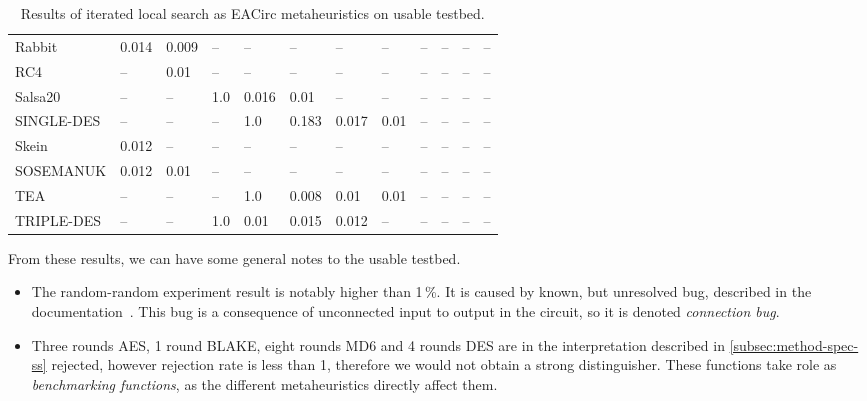 \documentclass[
  print, %
  Table,   %
  nolof,     %
  nolot,     %
  11pt, %
  oneside  %
]{fithesis3}
\newcommand{\fd}{\cellcolor{red!13}}
\newcommand{\fn}{\cellcolor{green!13}}
\begin{document}
\begin{table}[H]
\begin{tabular}{l|l l l l l l l l l l l}
Rabbit       & \fn{}0.014 & \fn{}0.009 & \fn{}--    & \fn{}--    & \fn{}--    & \fn{}--    & \fn{}--    & \fn{}--    & \fn{}--    & \fn{}--    & \fn{}--   \\
RC4          & \fd{}--    & \fn{}0.01  & \fn{}--    & \fn{}--    & \fn{}--    & \fn{}--    & \fn{}--    & \fn{}--    & \fn{}--    & \fn{}--    & \fn{}--   \\
Salsa20      & \fd{}--    & \fd{}--    & \fd{}1.0   & \fn{}0.016 & \fn{}0.01  & \fn{}--    & \fn{}--    & \fn{}--    & \fn{}--    & \fn{}--    & \fn{}--   \\
SINGLE-DES   & \fd{}--    & \fd{}--    & \fd{}--    & \fd{}1.0   & \fd{}0.183 & \fn{}0.017 & \fn{}0.01  & \fn{}--    & \fn{}--    & \fn{}--    & \fn{}--   \\
Skein        & \fn{}0.012 & \fn{}--    & \fn{}--    & \fn{}--    & \fn{}--    & \fn{}--    & \fn{}--    & \fn{}--    & \fn{}--    & \fn{}--    & \fn{}--   \\
SOSEMANUK    & \fn{}0.012 & \fn{}0.01  & \fn{}--    & \fn{}--    & \fn{}--    & \fn{}--    & \fn{}--    & \fn{}--    & \fn{}--    & \fn{}--    & \fn{}--   \\
TEA          & \fd{}--    & \fd{}--    & \fd{}--    & \fd{}1.0   & \fn{}0.008 & \fn{}0.01  & \fn{}0.01  & \fn{}--    & \fn{}--    & \fn{}--    & \fn{}--   \\
TRIPLE-DES   & \fd{}--    & \fd{}--    & \fd{}1.0   & \fn{}0.01  & \fn{}0.015 & \fn{}0.012 & \fn{}--    & \fn{}--    & \fn{}--    & \fn{}--    & \fn{}--   
\end{tabular}
\caption{Results of iterated local search as EACirc metaheuristics on usable testbed.}
\label{table:res-usable-ils}
\end{table}

From these results, we can have some general notes to the usable testbed.

\begin{itemize}
    \item The random-random experiment result is notably higher than 1\,\%. It is caused by known, but unresolved bug, described in the documentation~\cite{EACirc-wiki-bug}. This bug is a consequence of unconnected input to output in the circuit, so it is denoted \textit{connection bug}.
    \item Three rounds AES, 1 round BLAKE, eight rounds MD6 and 4 rounds DES are in the interpretation described in \cref{subsec:method-spec-ss} rejected, however rejection rate is less than 1, therefore we would not obtain a strong distinguisher. These functions take role as \textit{benchmarking functions}, as the different metaheuristics directly affect them.
\end{itemize}
\end{document}
